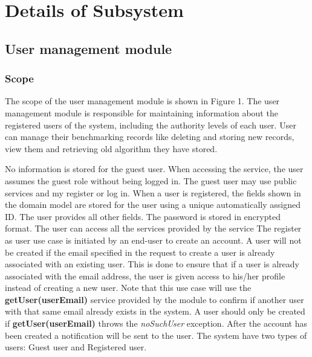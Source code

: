 \documentclass[runningheads,a4paper]{article}
\begin{document}



\section{Details of Subsystem}
\subsection{User management module}
\subsubsection{\textbf{Scope}}\newline
\newline
The scope of the user management module is shown in Figure 1. The user
management module is responsible for maintaining information about the registered
users of the system, including the authority levels of each user. User can manage their benchmarking records like deleting and storing new records, view them and retrieving old algorithm they have stored.

\newline
\newline No information is stored for the guest user. When accessing the service, the user
assumes the guest role without being logged in. The guest user may use public
services and my register or log in.
When a user is registered, the fields shown in the domain model are stored for the
user using a unique automatically assigned ID. The user provides all other fields. The
password is stored in encrypted format. The user can access all the services provided by the service
The register as user  use case is initiated by an end-user to create an account.\newline\newline
A user will not be created if the email specified in the request to create a user is already
associated with an existing user. This is done to ensure that if a user is already associated
with the email address, the user is given access to his/her profile instead of creating a new
user.\newline\newline
Note that this use case will use the \textbf{getUser(userEmail)} service provided by the module to
confirm if another user with that same email already exists in the system. A user should
only be created if \textbf{getUser(userEmail)} throws the \textit{noSuchUser} exception.
After the account has been created a notification will be sent to the user. The system have two types of users: Guest user and Registered user.
\end{document}
